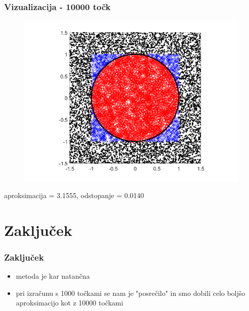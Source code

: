 \documentclass{beamer}
\begin{document}
\begin{frame}
\frametitle{Vizualizacija - 10000 točk}

\begin{figure}
  \centering
  \includegraphics[width = 0.6 \linewidth]{10000.png}
\end{figure}
\centering
aproksimacija = 3.1555, odstopanje = 0.0140

\end{frame}

\section{Zaključek}
\begin{frame}
\frametitle{Zaključek}

\begin{itemize}
  \item metoda je kar natančna
  \item pri izračunu s 1000 točkami se nam je "posrečilo" in smo dobili celo boljšo aproksimacijo kot z 10000 točkami
\end{itemize}

\end{frame}
\end{document}
